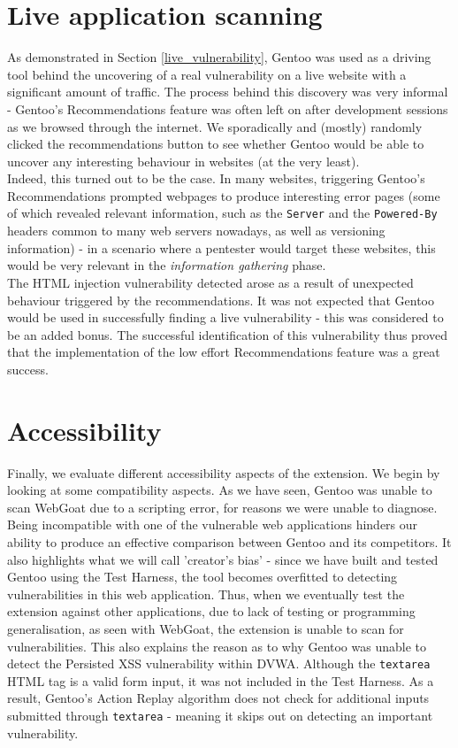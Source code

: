 \section{Live application scanning}

As demonstrated in Section \ref{live_vulnerability}, Gentoo was used as a driving tool behind the uncovering of a real vulnerability on a live website with a significant amount of traffic. The process behind this discovery was very informal - Gentoo's Recommendations feature was often left on after development sessions as we browsed through the internet. We sporadically and (mostly) randomly clicked the recommendations button to see whether Gentoo would be able to uncover any interesting behaviour in websites (at the very least). \\

Indeed, this turned out to be the case. In many websites, triggering Gentoo's Recommendations prompted webpages to produce interesting error pages (some of which revealed relevant information, such as the \texttt{Server} and the \texttt{Powered-By} headers common to many web servers nowadays, as well as versioning information) - in a scenario where a pentester would target these websites, this would be very relevant in the \textit{information gathering} phase. \\

The HTML injection vulnerability detected arose as a result of unexpected behaviour triggered by the recommendations. It was not expected that Gentoo would be used in successfully finding a live vulnerability - this was considered to be an added bonus. The successful identification of this vulnerability thus proved that the implementation of the low effort Recommendations feature was a great success. \\


\section{Accessibility}

Finally, we evaluate different accessibility aspects of the extension. We begin by looking at some compatibility aspects. As we have seen, Gentoo was unable to scan WebGoat due to a scripting error, for reasons we were unable to diagnose. Being incompatible with one of the vulnerable web applications hinders our ability to produce an effective comparison between Gentoo and its competitors. It also highlights what we will call 'creator's bias' - since we have built and tested Gentoo using the Test Harness, the tool becomes overfitted to detecting vulnerabilities in this web application. Thus, when we eventually test the extension against other applications, due to lack of testing or programming generalisation, as seen with WebGoat, the extension is unable to scan for vulnerabilities. This also explains the reason as to why Gentoo was unable to detect the Persisted XSS vulnerability within DVWA. Although the \texttt{textarea} HTML tag is a valid form input, it was not included in the Test Harness. As a result, Gentoo's Action Replay algorithm does not check for additional inputs submitted through \texttt{textarea} - meaning it skips out on detecting an important vulnerability. \\

